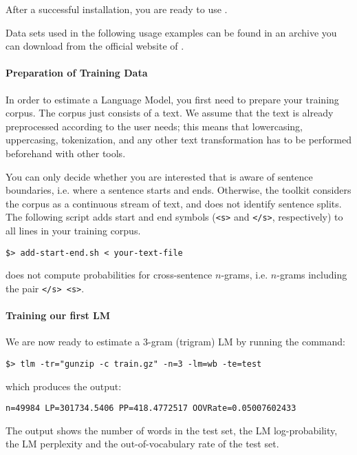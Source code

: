 After a successful installation, you are ready to use {\IRSTLM}.

\noindent
Data sets used in the following usage examples can be found in an archive you can download from the official website of {\IRSTLM}.




\paragraph{Preparation of Training Data}
In order to estimate a Language Model, you first need to prepare your training corpus. The corpus just consists of a text.
We assume that the text is already preprocessed according to the user needs; this means that lowercasing, uppercasing, tokenization, and any other text transformation has to be performed beforehand with other tools.

\noindent
You can only decide whether you are interested that {\IRSTLM} is aware
of sentence boundaries, i.e. where a sentence starts and ends. Otherwise,
the toolkit considers the corpus as a continuous stream of text, and does
not identify sentence splits.  The following script adds start and end
symbols ({\tt <s>} and {\tt </s>}, respectively) to all lines in your training corpus.
\begin{verbatim}
$> add-start-end.sh < your-text-file 
\end{verbatim}


\noindent
{\IRSTLM} does not compute probabilities for cross-sentence $n$-grams, i.e. $n$-grams including the pair {\tt </s>  <s>}.


\paragraph{Training our first LM}
\noindent
We  are now ready to estimate a  3-gram (trigram)  LM by  running the command:

\begin{verbatim}
$> tlm -tr="gunzip -c train.gz" -n=3 -lm=wb -te=test
\end{verbatim}
\noindent
which produces the output:
\begin{verbatim}
n=49984 LP=301734.5406 PP=418.4772517 OOVRate=0.05007602433
\end{verbatim}
\noindent
The output shows the number of  words in the test set, the LM log-probability, the LM perplexity  
and the out-of-vocabulary rate  of the test set.

